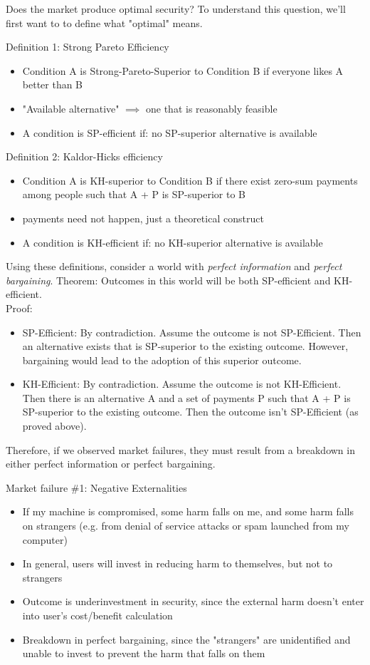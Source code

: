 Does the market produce optimal security? To understand this question, we'll first want to to define what "optimal" means. 


Definition 1: Strong Pareto Efficiency
\begin{itemize}
    \item Condition A is Strong-Pareto-Superior to Condition B if everyone likes A better than B
    \item "Available alternative" $\implies$ one that is reasonably feasible
    \item A condition is SP-efficient if: no SP-superior alternative is available
\end{itemize}
Definition 2: Kaldor-Hicks efficiency
\begin{itemize}
    \item Condition A is KH-superior to Condition B if there exist zero-sum payments among people such that A + P is SP-superior to B
    \item payments need not happen, just a theoretical construct
    \item A condition is KH-efficient if: no KH-superior alternative is available
\end{itemize}
Using these definitions, consider a world with \emph{perfect information} and \emph{perfect bargaining}. Theorem: Outcomes in this world will be both SP-efficient and KH-efficient. 
\\
Proof:
\begin{itemize}
	\item SP-Efficient: By contradiction. Assume the outcome is not SP-Efficient. Then an alternative exists that is SP-superior to the existing outcome. However, bargaining would lead to the adoption of this superior outcome.
	\item KH-Efficient: By contradiction. Assume the outcome is not KH-Efficient. Then there is an alternative A and a set of payments P such that A + P is SP-superior to the existing outcome. Then the outcome isn't SP-Efficient (as proved above).
\end{itemize}
Therefore, if we observed market failures, they must result from a breakdown in either perfect information or perfect bargaining.

Market failure \#1: Negative Externalities
	\begin{itemize}
		\item If my machine is compromised, some harm falls on me, and some harm falls on strangers (e.g. from denial of service attacks or spam launched from my computer)
		\item In general, users will invest in reducing harm to themselves, but not to strangers
		\item Outcome is underinvestment in security, since the external harm doesn't enter into user's cost/benefit calculation
		\item Breakdown in perfect bargaining, since the "strangers" are unidentified and unable to invest to prevent the harm that falls on them
	\end{itemize}
	
